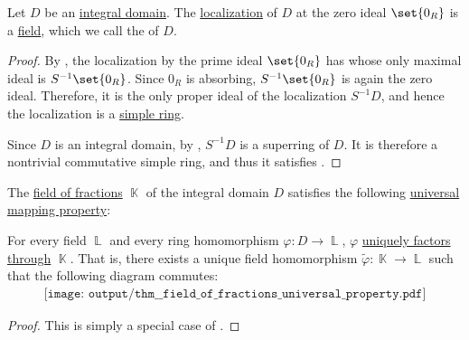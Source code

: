 \begin{proposition}\label{thm:field_of_fractions}
  Let \( D \) be an \hyperref[def:integral_domain]{integral domain}. The \hyperref[def:ring_localization]{localization} of \( D \) at the zero ideal \( \set{ 0_R } \) is a \hyperref[def:field]{field}, which we call the  of \( D \).
\end{proposition}
\begin{proof}
  By , the localization by the prime ideal \( \set{ 0_R } \) has  whose only maximal ideal is \( S^{-1} \set{ 0_R } \). Since \( 0_R \) is absorbing, \( S^{-1} \set{ 0_R } \) is again the zero ideal.  Therefore, it is the only proper ideal of the localization \( S^{-1} D \), and hence the localization is a \hyperref[def:ring/simple]{simple ring}.

  Since \( D \) is an integral domain, by , \( S^{-1} D \) is a superring of \( D \). It is therefore a nontrivial commutative simple ring, and thus it satisfies .
\end{proof}

\begin{proposition}\label{thm:field_of_fractions_universal_property}
  The \hyperref[def:field_of_fractions]{field of fractions} \( \BbbK \) of the integral domain \( D \) satisfies the following \hyperref[rem:universal_mapping_property]{universal mapping property}:
  \begin{displayquote}
    For every field \( \BbbL \) and every ring homomorphism \( \varphi: D \to \BbbL \), \( \varphi \) \hyperref[def:factors_through]{uniquely factors through} \( \BbbK \). That is, there exists a unique field homomorphism \( \widetilde{\varphi}: \BbbK \to \BbbL \) such that the following diagram commutes:
    \begin{equation}\label{eq:thm:field_of_fractions_universal_property/diagram}
      \begin{aligned}
        \texttt{[image: output/thm\_\_field\_of\_fractions\_universal\_property.pdf]}
      \end{aligned}
    \end{equation}
  \end{displayquote}
\end{proposition}
\begin{proof}
  This is simply a special case of .
\end{proof}


